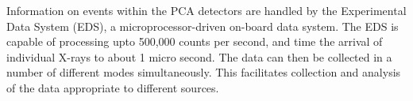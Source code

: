 \documentclass[a4paper,twoside]{report}
\numberwithin{equation}{section}
\begin{document}
Information on events within the PCA detectors are handled by the Experimental Data System (EDS), a microprocessor-driven on-board data system. The EDS is capable of processing upto 500,000 counts per second, and time the arrival of individual X-rays to about 1 micro second. The data can then be collected in a number of different modes simultaneously. This facilitates collection and analysis of the data appropriate to different sources. 
\end{document}
